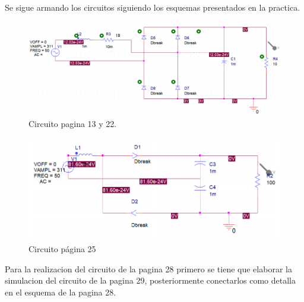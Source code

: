 ﻿\documentclass[letterpaper]{article}
\begin{document}
\begin{large}
        Se sigue armando los circuitos siguiendo los esquemas presentados en la practica.
        \begin{figure}
            \centering
            \includegraphics[scale=0.5]{cirp13y22.png}
            \caption{Circuito pagina 13 y 22.}
            \label{fig:Cir13y24}
        \end{figure}\newpage
        \begin{figure}[htbp]
            \centering
            \includegraphics[scale=0.8]{cirp25.png}
            \caption{Circuito página 25}
            \label{fig:Cirp25}
        \end{figure}\newpage
        Para la realizacion del circuito de la pagina 28 primero se tiene que elaborar la simulacion del circuito de la pagina 29, posteriormente conectarlos como detalla en el esquema de la pagina 28.
        \begin{figure}[htbp]
            \centering

\end{figure}
\end{large}
\end{document}
